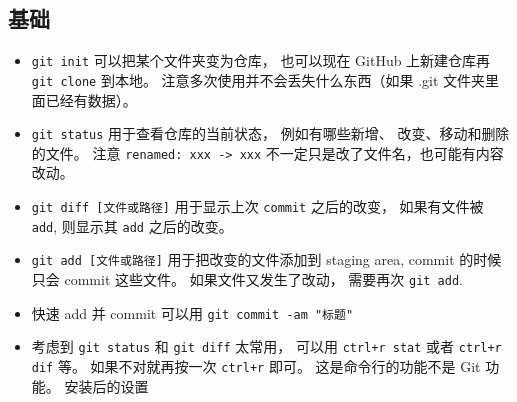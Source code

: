 \subsection{基础}
\begin{itemize}
\item \verb|git init| 可以把某个文件夹变为仓库， 也可以现在 GitHub 上新建仓库再 \verb|git clone| 到本地。 注意多次使用并不会丢失什么东西（如果 .git 文件夹里面已经有数据）。
\item \verb|git status| 用于查看仓库的当前状态， 例如有哪些新增、 改变、移动和删除的文件。 注意 \verb|renamed: xxx -> xxx| 不一定只是改了文件名，也可能有内容改动。
\item \verb|git diff [文件或路径]| 用于显示上次 \verb|commit| 之后的改变， 如果有文件被 \verb|add|, 则显示其 \verb|add| 之后的改变。
\item \verb|git add [文件或路径]| 用于把改变的文件添加到 staging area, commit 的时候只会 commit 这些文件。 如果文件又发生了改动， 需要再次 \verb|git add|.
\item 快速 add 并 commit 可以用 \verb|git commit -am "标题"|
\item 考虑到 \verb|git status| 和 \verb|git diff| 太常用， 可以用 \verb|ctrl+r stat| 或者 \verb|ctrl+r dif| 等。 如果不对就再按一次 \verb|ctrl+r| 即可。 这是命令行的功能不是 Git 功能。
安装后的设置
\end{itemize}

